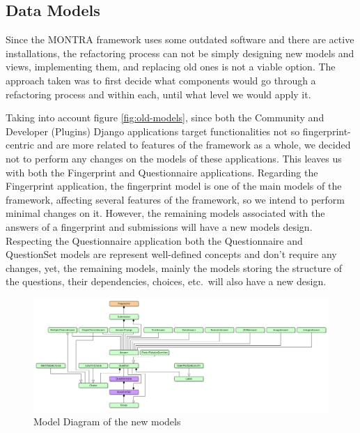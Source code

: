 \subsection{Data Models}


Since the MONTRA framework uses some outdated software and there are active installations, the refactoring process can not be simply designing new models and views, implementing them, and replacing old ones is not a viable option.
The approach taken was to first decide what components would go through a refactoring process and within each, until what level we would apply it.

Taking into account figure \ref{fig:old-models}, since both the Community and Developer (Plugins) Django applications target functionalities not so fingerprint-centric and are more related to features of the framework as a whole, we decided not to perform any changes on the models of these applications.
This leaves us with both the Fingerprint and Questionnaire applications.
Regarding the Fingerprint application, the fingerprint model is one of the main models of the framework, affecting several features of the framework, so we intend to perform minimal changes on it.
However, the remaining models associated with the answers of a fingerprint and submissions will have a new models design.
Respecting the Questionnaire application both the Questionnaire and QuestionSet models are represent well-defined concepts and don't require any changes, yet, the remaining models, mainly the models storing the structure of the questions, their dependencies, choices, etc.\, will also have a new design.

\begin{figure}
    \center
    \includegraphics[width=\textwidth]{new-models}
    \caption{Model Diagram of the new models}
    \label{fig:new-models}
\end{figure}

